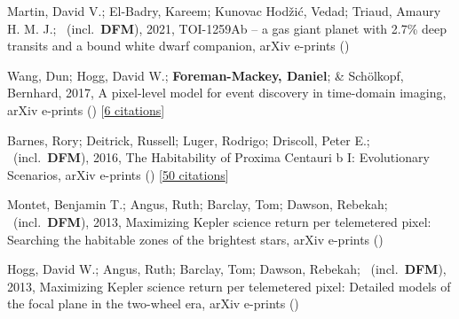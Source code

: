 \item[{\color{numcolor}\scriptsize5}] Martin, David V.; El-Badry, Kareem; Kunovac Hod{\v{z}}i{\'c}, Vedad; Triaud, Amaury H. M. J.; \etal\ (incl.\ \textbf{DFM}), 2021, TOI-1259Ab -- a gas giant planet with 2.7{\%} deep transits and a bound white dwarf companion, arXiv e-prints ()

\item[{\color{numcolor}\scriptsize4}] Wang, Dun; Hogg, David W.; \textbf{Foreman-Mackey, Daniel}; \& Sch{\"o}lkopf, Bernhard, 2017, A pixel-level model for event discovery in time-domain imaging, arXiv e-prints () [\href{https://ui.adsabs.harvard.edu/abs/2017arXiv171002428W}{6 citations}]

\item[{\color{numcolor}\scriptsize3}] Barnes, Rory; Deitrick, Russell; Luger, Rodrigo; Driscoll, Peter E.; \etal\ (incl.\ \textbf{DFM}), 2016, The Habitability of Proxima Centauri b I: Evolutionary Scenarios, arXiv e-prints () [\href{https://ui.adsabs.harvard.edu/abs/2016arXiv160806919B}{50 citations}]

\item[{\color{numcolor}\scriptsize2}] Montet, Benjamin T.; Angus, Ruth; Barclay, Tom; Dawson, Rebekah; \etal\ (incl.\ \textbf{DFM}), 2013, Maximizing Kepler science return per telemetered pixel: Searching the habitable zones of the brightest stars, arXiv e-prints ()

\item[{\color{numcolor}\scriptsize1}] Hogg, David W.; Angus, Ruth; Barclay, Tom; Dawson, Rebekah; \etal\ (incl.\ \textbf{DFM}), 2013, Maximizing Kepler science return per telemetered pixel: Detailed models of the focal plane in the two-wheel era, arXiv e-prints ()
